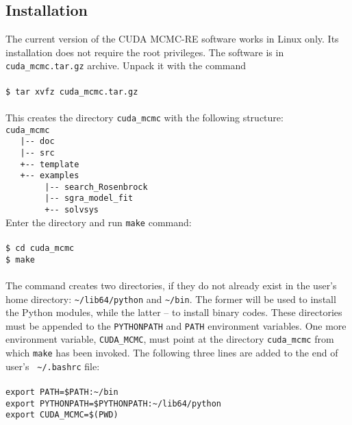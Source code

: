\documentclass[preprint2]{aastex}
\begin{document}
\subsection{Installation}

The current version of the CUDA MCMC-RE software works in Linux only. Its 
installation does not require the root privileges. The software is in 
\verb|cuda_mcmc.tar.gz| archive. Unpack it with the command \\\\
\verb|$ tar xvfz cuda_mcmc.tar.gz| \\\\
This creates the directory \verb"cuda_mcmc" with the following structure: \\

\verb"cuda_mcmc" \\
\verb"   |-- doc" \\
\verb"   |-- src" \\
\verb"   +-- template" \\
\verb"   +-- examples" \\
\verb"        |-- search_Rosenbrock" \\
\verb"        |-- sgra_model_fit" \\
\verb"        +-- solvsys" \\

Enter the directory and run \verb|make| command: \\\\
\verb|$ cd cuda_mcmc| \\
\verb|$ make| \\\\
The command creates two directories, if they do not already exist in the user's 
home directory: \verb|~/lib64/python| and \verb|~/bin|. The former will be used 
to install the Python modules, while the latter -- to install binary codes. 
These directories must be appended to the \verb|PYTHONPATH| and \verb|PATH| 
environment variables. One more environment variable, \verb|CUDA_MCMC|, must
point at the directory \verb|cuda_mcmc| from which \verb|make| has been invoked. 
The following three lines are added to the end of user's \verb| ~/.bashrc| file: \\\\
\verb|export PATH=$PATH:~/bin| \\
\verb|export PYTHONPATH=$PYTHONPATH:~/lib64/python| \\
\verb|export CUDA_MCMC=$(PWD)| \\\\
\end{document}
